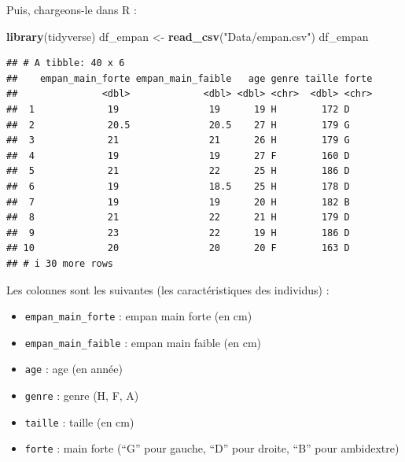 \documentclass[
  11pt,
]{book}
\newcommand{\VERB}{\Verb[commandchars=\\\{\}]}
\newenvironment{Shaded}{\begin{snugshade}}{\end{snugshade}}
\newcommand{\FunctionTok}[1]{\textcolor[rgb]{0.13,0.29,0.53}{\textbf{#1}}}
\newcommand{\NormalTok}[1]{#1}
\newcommand{\OtherTok}[1]{\textcolor[rgb]{0.56,0.35,0.01}{#1}}
\newcommand{\StringTok}[1]{\textcolor[rgb]{0.31,0.60,0.02}{#1}}
\providecommand{\tightlist}{%
  \setlength{\itemsep}{0pt}\setlength{\parskip}{0pt}}
\numberwithin{equation}{section}
\numberwithin{countremarque}{section}
\newenvironment{greenbox}{
  \begin{tcolorbox}[breakable, colback=vert,coltext=black,
                  colframe=grisfonce]}
 {\end{tcolorbox}}
\begin{document}
Puis, chargeons-le dans R :

\begin{Shaded}
\begin{Highlighting}[]
\FunctionTok{library}\NormalTok{(tidyverse)}
\NormalTok{df\_empan }\OtherTok{\textless{}{-}} \FunctionTok{read\_csv}\NormalTok{(}\StringTok{"Data/empan.csv"}\NormalTok{)}
\NormalTok{df\_empan}
\end{Highlighting}
\end{Shaded}

\begin{lstlisting}
## # A tibble: 40 x 6
##    empan_main_forte empan_main_faible   age genre taille forte
##               <dbl>             <dbl> <dbl> <chr>  <dbl> <chr>
##  1             19                19      19 H        172 D    
##  2             20.5              20.5    27 H        179 G    
##  3             21                21      26 H        179 G    
##  4             19                19      27 F        160 D    
##  5             21                22      25 H        186 D    
##  6             19                18.5    25 H        178 D    
##  7             19                19      20 H        182 B    
##  8             21                22      21 H        179 D    
##  9             23                22      19 H        186 D    
## 10             20                20      20 F        163 D    
## # i 30 more rows
\end{lstlisting}

Les colonnes sont les suivantes (les caractéristiques des individus) :

\begin{itemize}
\tightlist
\item
  \texttt{empan\_main\_forte} : empan main forte (en cm)
\item
  \texttt{empan\_main\_faible} : empan main faible (en cm)
\item
  \texttt{age} : age (en année)
\item
  \texttt{genre} : genre (H, F, A)
\item
  \texttt{taille} : taille (en cm)
\item
  \texttt{forte} : main forte (``G'' pour gauche, ``D'' pour droite, ``B'' pour ambidextre)
\end{itemize}

\begin{greenbox}


\end{greenbox}
\end{document}
